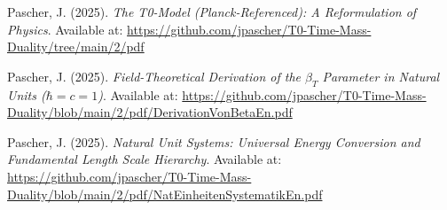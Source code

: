 \documentclass[12pt,a4paper]{article}
\begin{document}
	\newpage
	\begin{thebibliography}{99}
		Pascher, J. (2025). \textit{The T0-Model (Planck-Referenced): A Reformulation of Physics}. Available at: \url{https://github.com/jpascher/T0-Time-Mass-Duality/tree/main/2/pdf}
		
		Pascher, J. (2025). \textit{Field-Theoretical Derivation of the $\beta_T$ Parameter in Natural Units ($\hbar = c = 1$)}. Available at: \url{https://github.com/jpascher/T0-Time-Mass-Duality/blob/main/2/pdf/DerivationVonBetaEn.pdf}
		
		Pascher, J. (2025). \textit{Natural Unit Systems: Universal Energy Conversion and Fundamental Length Scale Hierarchy}. Available at: \url{https://github.com/jpascher/T0-Time-Mass-Duality/blob/main/2/pdf/NatEinheitenSystematikEn.pdf}
		
	\end{thebibliography}
	
\end{document}
